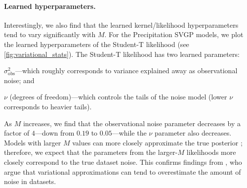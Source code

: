 \paragraph{Learned hyperparameters.}
Interestingly, we also find that the learned kernel/likelihood hyperparameters tend to vary significantly with $M$.
For the Precipitation SVGP models, we plot the learned hyperparameters of the Student-T likelihood (see \cref{fig:variational_stats}).
The Student-T likelihood has two learned parameters:
%
\begin{enumerate*}
  \item $\sigma^2_\text{obs}$---which roughly corresponds to variance explained away as observational noise; and
  \item $\nu$ (degrees of freedom)---which controls the tails of the noise model (lower $\nu$ corresponds to heavier tails).
\end{enumerate*}
%
As $M$ increases, we find that the observational noise parameter decreases by a factor of $4$---down from $0.19$ to $0.05$---while the $\nu$ parameter also decreases.
Models with larger $M$ values can more closely approximate the true posterior \cite{hensman2013gaussian}; therefore, we expect that the parameters from the larger-$M$ likelihoods more closely correspond to the true dataset noise.
This confirms findings from \citet{bauer2016understanding}, who argue that variational approximations can tend to overestimate the amount of noise in datasets.
